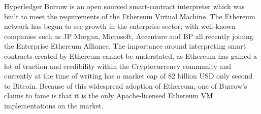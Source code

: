 

Hyperledger Burrow is an open sourced smart-contract interpreter which was built 
to meet the requirements of the Ethereum Virtual Machine. The Ethereum network has 
begun to see growth in the enterprise sector; with well-known companies such as 
JP Morgan, Microsoft, Accenture and BP all recently joining the Enterprise Ethereum 
Alliance.\cite{Behlendorf} The importance around interpreting smart contracts created
by Ethereum cannot be understated, as Ethereum has gained a lot of traction and
credibility within the Cryptocurrency community and currently at the time of writing
has a market cap of 82 billion USD only second to Bitcoin. Because of this widespread 
adoption of Ethereum, one of Burrow’s claims to fame is that it is the only 
Apache-licensed Ethereum VM implementations on the market.\cite{Hyperledger Burrow}

